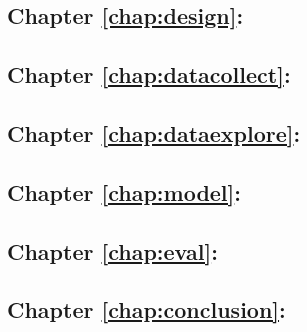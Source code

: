\subsection* {Chapter \ref{chap:design}: }
\subsection* {Chapter \ref{chap:datacollect}: }
\subsection* {Chapter \ref{chap:dataexplore}: }
\subsection* {Chapter \ref{chap:model}: }
\subsection* {Chapter \ref{chap:eval}: }
\subsection* {Chapter \ref{chap:conclusion}: }